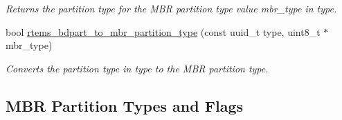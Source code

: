 \begin{DoxyCompactItemize}
\begin{DoxyCompactList}\small\item\em Returns the partition type for the M\+BR partition type value {\itshape mbr\+\_\+type} in {\itshape type}. \end{DoxyCompactList}\item 
bool \mbox{\hyperlink{group__rtems__bdpart_ga13ba144439be58871fa6c7e26854f11a}{rtems\+\_\+bdpart\+\_\+to\+\_\+mbr\+\_\+partition\+\_\+type}} (const uuid\+\_\+t type, uint8\+\_\+t $\ast$mbr\+\_\+type)
\begin{DoxyCompactList}\small\item\em Converts the partition type in {\itshape type} to the M\+BR partition type. \end{DoxyCompactList}\end{DoxyCompactItemize}
\subsection*{M\+BR Partition Types and Flags}
